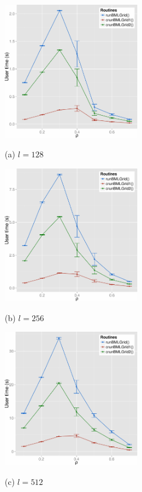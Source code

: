 \documentclass{article}
\begin{document}
\begin{figure}[H]
    \begin{minipage}[b]{0.5\linewidth}
      \centering
      \centerline{\includegraphics[width=6.0cm]{./figs/TestRunningTime_128.pdf}}
      \centerline{(a) $l = 128$}\medskip
    \end{minipage}
    \hfill
    \begin{minipage}[b]{0.5\linewidth}
      \centering
      \centerline{\includegraphics[width=6.0cm]{./figs/TestRunningTime_256.pdf}}
      \centerline{(b) $l = 256$}\medskip
    \end{minipage}
    \hfill
    \begin{minipage}[b]{0.5\linewidth}
      \centering
      \centerline{\includegraphics[width=6.0cm]{./figs/TestRunningTime_512.pdf}}
      \centerline{(c) $l=512$}\medskip

\end{minipage}
\end{figure}
\end{document}
